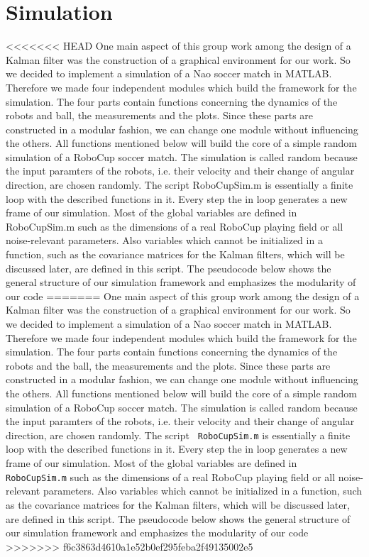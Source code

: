 
\chapter{Simulation}

<<<<<<< HEAD
One main aspect of this group work among the design of a Kalman filter was the construction of a graphical environment for our work. So we decided to implement a simulation of a Nao soccer match in MATLAB. Therefore we made four independent modules which build the framework for the simulation. The four parts contain functions concerning the dynamics of the robots and ball, the measurements and the plots. Since these parts are constructed in a modular fashion, we can change one module without influencing the others. All functions mentioned below will build the core of a simple random simulation of a RoboCup soccer match. The simulation is called random because the input paramters of the robots, i.e. their velocity and their change of angular direction, are chosen randomly. The script {\selectfont RoboCupSim.m} is essentially a finite loop with the described functions in it. Every step the in loop generates a new frame of our simulation. Most of the global variables are defined in {\selectfont RoboCupSim.m} such as the dimensions of a real RoboCup playing field or all noise-relevant parameters. Also variables which cannot be initialized in a function, such as the covariance matrices for the Kalman filters, which will be discussed later, are defined in this script. The pseudocode below shows the general structure of our simulation framework and emphasizes the modularity of our code
=======
One main aspect of this group work among the design of a Kalman filter was the construction of a graphical environment for our work. So we decided to implement a simulation of a Nao soccer match in MATLAB. Therefore we made four independent modules which build the framework for the simulation. The four parts contain functions concerning the dynamics of the robots and the ball, the measurements and the plots. Since these parts are constructed in a modular fashion, we can change one module without influencing the others. All functions mentioned below will build the core of a simple random simulation of a RoboCup soccer match. The simulation is called random because the input paramters of the robots, i.e. their velocity and their change of angular direction, are chosen randomly. The script \texttt{ RoboCupSim.m} is essentially a finite loop with the described functions in it. Every step the in loop generates a new frame of our simulation. Most of the global variables are defined in \texttt{ RoboCupSim.m} such as the dimensions of a real RoboCup playing field or all noise-relevant parameters. Also variables which cannot be initialized in a function, such as the covariance matrices for the Kalman filters, which will be discussed later, are defined in this script. The pseudocode below shows the general structure of our simulation framework and emphasizes the modularity of our code
>>>>>>> f6c3863d4610a1e52b0ef295feba2f49135002e5

